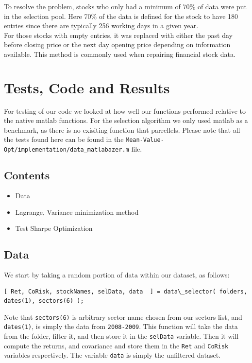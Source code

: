 \documentclass[12pt]{article}
\begin{document}
To resolve the problem, stocks who only had a minimum of 70\% of data were put in the selection pool. Here 70\% of the data is defined for the stock to have 180 entries since there are typically 256 working days in a given year.\\

For those stocks with empty entries, it was replaced with either the past day before closing price or the next day opening price depending on information available. This method is commonly used when repairing financial stock data.  


\section{Tests, Code and Results}

\begin{par}
For testing of our code we looked at how well our functions performed relative to the native matlab functions. For the selection algorithm we only used matlab as a benchmark, as there is no exisiting function that parrellels. Please note that all the tests found here can be found in the \texttt{Mean-Value-Opt/implementation/data\_matlabazer.m} file.
\end{par} \vspace{1em}

\subsection*{Contents}

\begin{itemize}
\setlength{\itemsep}{-1ex}
   \item Data
   \item Lagrange, Variance minimization method
   \item Test Sharpe Optimization
\end{itemize}


\subsection*{Data}

\begin{par}
We start by taking a random portion of data within our dataset, as follows:
\end{par} \vspace{1em}
\begin{verbatim}[ Ret, CoRisk, stockNames, selData, data  ] = data\_selector( folders,  dates(1), sectors(6) );\end{verbatim}
\begin{par}
Note that \texttt{sectors(6)} is arbitrary sector name chosen from our sectors list, and \texttt{dates(1)}, is simply the data from \texttt{2008-2009}. This function will take the data from the folder, filter it, and then store it in the \texttt{selData} variable. Then it will compute the returns, and covariance and store them in the \texttt{Ret} and \texttt{CoRisk} variables respectively. The variable \texttt{data} is simply the unfiltered dataset.
\end{par} \vspace{1em}
\end{document}
